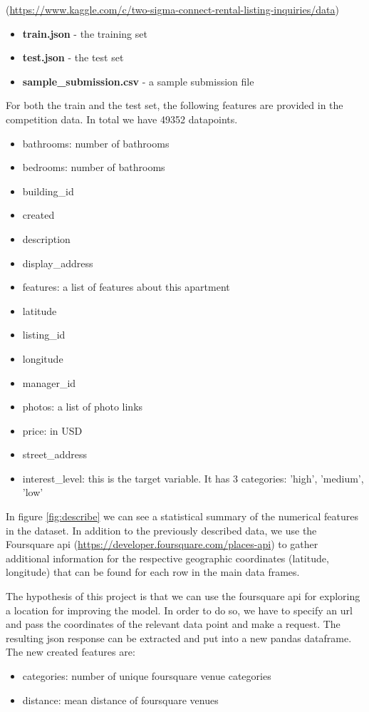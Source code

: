 \documentclass[runningheads]{llncs}
\begin{document}
    (\url{https://www.kaggle.com/c/two-sigma-connect-rental-listing-inquiries/data})

    \begin{itemize}
        \item \textbf{train.json} - the training set
        \item \textbf{test.json} - the test set 
        \item \textbf{sample\_submission.csv} - a sample submission file 
	\end{itemize}
	
	For both the train and the test set, the following features are provided in the competition data. In total we have 49352 datapoints.
	
    \begin{itemize}	
        \item bathrooms: number of bathrooms
        \item bedrooms: number of bathrooms
        \item building\_id
        \item created
        \item description
        \item display\_address
        \item features: a list of features about this apartment
        \item latitude
        \item listing\_id
        \item longitude
        \item manager\_id
        \item photos: a list of photo links
        \item price: in USD
        \item street\_address
        \item interest\_level: this is the target variable. It has 3 categories: 'high', 'medium', 'low'
    \end{itemize}
    
	
    In figure \ref{fig:describe} we can see a statistical summary of the numerical features in the dataset. In addition to the previously described data, we use the Foursquare api (\url{https://developer.foursquare.com/places-api}) to gather additional information for the respective geographic coordinates (latitude, longitude) that can be found for each row in the main data frames.
    
    The hypothesis of this project is that we can use the foursquare api for exploring a location for improving the model. In order to do so, we have to specify an url and pass the coordinates of the relevant data point and make a request. The resulting json response can be extracted and put into a new pandas dataframe. The new created features are:
    \begin{itemize}	
        \item categories: number of unique foursquare venue categories
        \item distance: mean distance of foursquare venues
    \end{itemize}
    
\end{document}

